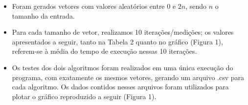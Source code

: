 \documentclass[fontsize=10pt]{article}
\begin{document}
\begin{itemize}
    \item Foram gerados vetores com valores aleatórios entre $0$ e $2n$, sendo $n$ o tamanho da entrada.
    
    \item Para cada tamanho de vetor, realizamos 10 iterações/medições; os valores apresentados a seguir, tanto na Tabela 2 quanto no gráfico (Figura 1), referem-se à média do tempo de execução nessas 10 iterações.
    
    \item Os testes dos dois algoritmos foram realizados em uma única execução do programa, com exatamente os mesmos vetores, gerando um arquivo .csv para cada algoritmo. Os dados contidos nesses arquivos foram utilizados para plotar o gráfico reproduzido a seguir (Figura 1).
\end{itemize}
\end{document}
